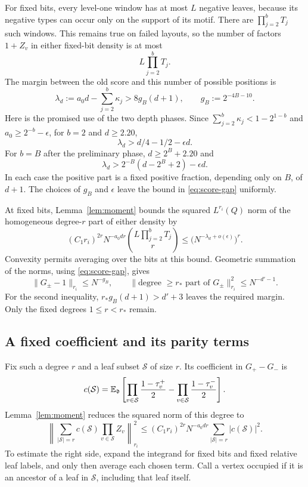 For fixed bits, every level-one window has at most $L$ negative leaves, because its negative types can occur only on the support of its motif.  There are $\prod_{j=2}^bT_j$ such windows.  This remains true on failed layouts, so the number of factors $1+Z_v$ in either fixed-bit density is at most
\[
 L\prod_{j=2}^bT_j.
\]
The margin between the old score and this number of possible positions is
\begin{equation}\label{eq:score-gap}
 \lambda_d:=a_0d-\sum_{j=2}^b\kappa_j>8g_B(d+1),
 \qquad g_B:=2^{-4B-10}.
\end{equation}
Here is the promised use of the two depth phases.  Since
$\sum_{j=2}^b\kappa_j<1-2^{1-b}$ and $a_0\ge2^{-b}-\epsilon$, for $b=2$ and $d\ge2.20$,
\[
 \lambda_d>d/4-1/2-\epsilon d.
\]
For $b=B$ after the preliminary phase, $d\ge2^B+2.20$ and
\[
 \lambda_d>2^{-B}(d-2^B+2)-\epsilon d.
\]
In each case the positive part is a fixed positive fraction, depending only on $B$, of $d+1$.  The choices of $g_B$ and $\epsilon$ leave the bound in \eqref{eq:score-gap} uniformly.

At fixed bits, Lemma~\ref{lem:moment} bounds the squared $L^{r_i}(Q)$ norm of the homogeneous degree-$r$ part of either density by
\[
 (C_1r_i)^{2r}N^{-a_0dr}
       \binom{L\prod_{j=2}^bT_j}{r}
 \le \bigl(N^{-\lambda_d+o(\epsilon)}\bigr)^r.
\]
Convexity permits averaging over the bits at this bound.  Geometric summation of the norms, using \eqref{eq:score-gap}, gives
\begin{equation}\label{eq:tree_high}
 \|G_\pm-1\|_{r_i}\le N^{-g_B},\qquad
 \|\text{degree }\ge r_*\text{ part of }G_\pm\|_{r_i}^2
       \le N^{-d'-1}.
\end{equation}
For the second inequality, $r_*g_B(d+1)>d'+3$ leaves the required margin.  Only the fixed degrees $1\le r<r_*$ remain.

\subsection{A fixed coefficient and its parity terms}

Fix such a degree $r$ and a leaf subset $\mathcal S$ of size $r$.  Its coefficient in $G_+-G_-$ is
\begin{equation}\label{eq:fixed-coefficient}
 c(\mathcal S)=\mathbb E_{\mathfrak d}\left[
       \prod_{v\in\mathcal S}\frac{1-\tau_v^+}{2}
       -\prod_{v\in\mathcal S}\frac{1-\tau_v^-}{2}\right].
\end{equation}
Lemma~\ref{lem:moment} reduces the squared norm of this degree to
\begin{equation}\label{eq:degree-reduction}
 \left\|\sum_{|\mathcal S|=r}c(\mathcal S)
       \prod_{v\in\mathcal S}Z_v\right\|_{r_i}^2
 \le (C_1r_i)^{2r}N^{-a_0dr}
       \sum_{|\mathcal S|=r}|c(\mathcal S)|^2.
\end{equation}
To estimate the right side, expand the integrand for fixed bits and fixed relative leaf labels, and only then average each chosen term.  Call a vertex occupied if it is an ancestor of a leaf in $\mathcal S$, including that leaf itself.

